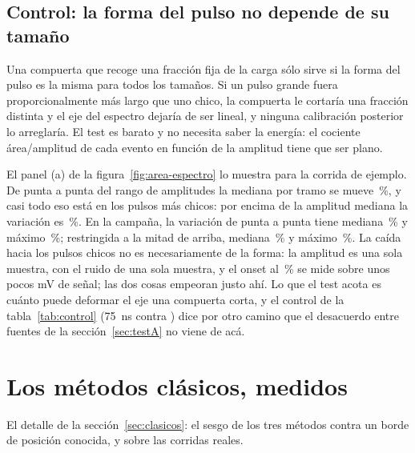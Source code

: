 \documentclass[11pt,a4paper]{article}
\begin{document}
\subsection{Control: la forma del pulso no depende de su tamaño}
\label{sec:forma-amplitud}

Una compuerta que recoge una fracción fija de la carga sólo sirve si la forma
del pulso es la misma para todos los tamaños. Si un pulso grande fuera
proporcionalmente más largo que uno chico, la compuerta le cortaría una
fracción distinta y el eje del espectro dejaría de ser lineal, y ninguna
calibración posterior lo arreglaría. El test es barato y no necesita saber la
energía: el cociente área/amplitud de cada evento en función de la amplitud
tiene que ser plano.

El panel (a) de la figura~\ref{fig:area-espectro} lo muestra para la corrida
de ejemplo. De punta a punta del rango de amplitudes la mediana por tramo se
mueve \EjVariacionForma\,\%, y casi todo eso está en los pulsos más chicos:
por encima de la amplitud mediana la variación es \EjVariacionAlta\,\%. En la
campaña, la variación de punta a punta tiene mediana \VariacionFormaMediana\,\%
y máximo \VariacionFormaMax\,\%; restringida a la mitad de arriba, mediana
\VariacionAltaMediana\,\% y máximo \VariacionAltaMax\,\%. La caída hacia los
pulsos chicos no es necesariamente de la forma: la amplitud es una sola
muestra, con el ruido de una sola muestra, y el onset al \FracOnset\,\% se
mide sobre unos pocos mV de señal; las dos cosas empeoran justo ahí. Lo que
el test acota es cuánto puede deformar el eje una compuerta corta, y el
control de la tabla~\ref{tab:control} (75~ns contra \PostFijo) dice por otro
camino que el desacuerdo entre fuentes de la sección~\ref{sec:testA} no viene
de acá.

\section{Los métodos clásicos, medidos}
\label{ap:clasicos}

El detalle de la sección~\ref{sec:clasicos}: el sesgo de los tres métodos
contra un borde de posición conocida, y sobre las corridas reales.

\begin{table}[htbp]
\centering
\caption{El sesgo de los tres métodos clásicos contra un borde de posición
conocida, en función de la resolución. El borde es la lineshape de
Klein-Nishina de la línea del Cs-137 (\ClasEgamma{} keV, borde en
\ClasEmax{} keV) convolucionada con una gaussiana de ancho $\sigma$. Las tres
primeras columnas llevan ruido de Poisson; las tres marcadas ``s/r'' son el
mismo cálculo sin ruido. Generada con \texttt{codigo/etapas/clasicos.py}.}
\label{tab:clasicos}
\footnotesize

\end{table}
\end{document}
